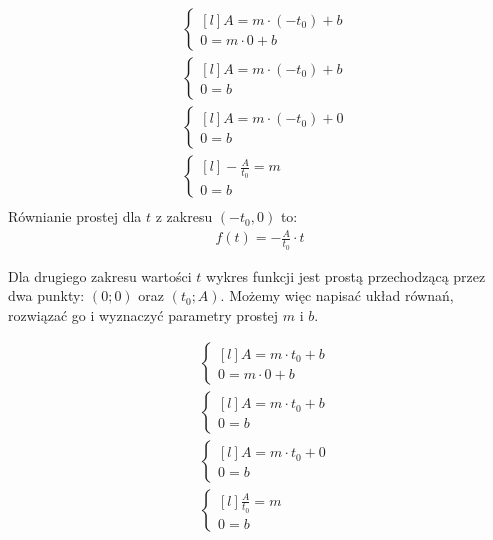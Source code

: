 \begin{task}
\begin{align*}
&\left\{\begin{matrix*}[l]
A = m\cdot (-t_{0}) +b\\ 
0 = m\cdot 0 +b
\end{matrix*}\right. \\
&\left\{\begin{matrix*}[l]
A = m\cdot (-t_{0}) +b\\ 
0 = b
\end{matrix*}\right. \\
&\left\{\begin{matrix*}[l]
A = m\cdot (-t_{0}) +0\\ 
0 = b
\end{matrix*}\right. \\
&\left\{\begin{matrix*}[l]
-\frac{A}{t_{0}} = m\\ 
0 = b
\end{matrix*}\right. \\
\end{align*}
Równianie prostej dla $t$ z zakresu  $(-t_{0},0)$ to:
\begin{align*}
f(t) = -\frac{A}{t_{0}}\cdot t
\end{align*}

Dla drugiego zakresu wartości $t$ wykres funkcji jest prostą przechodzącą przez dwa punkty: $(0;0)$ oraz $(t_{0};A)$. Możemy więc napisać układ równań, rozwiązać go i wyznaczyć parametry prostej $m$ i $b$.  

\begin{align*}
&\left\{\begin{matrix*}[l]
A = m\cdot t_{0} +b\\ 
0 = m\cdot 0 +b
\end{matrix*}\right. \\
&\left\{\begin{matrix*}[l]
A = m\cdot t_{0} +b\\ 
0 = b
\end{matrix*}\right. \\
&\left\{\begin{matrix*}[l]
A = m\cdot t_{0} +0\\ 
0 = b
\end{matrix*}\right. \\
&\left\{\begin{matrix*}[l]
\frac{A}{t_{0}} = m\\ 
0 = b
\end{matrix*}\right. \\
\end{align*}


\end{task}
